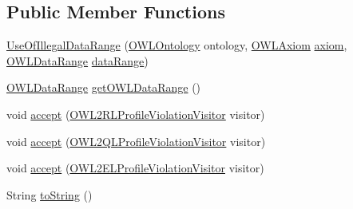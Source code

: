 \subsection*{Public Member Functions}
\begin{DoxyCompactItemize}
\item 
\hyperlink{classorg_1_1semanticweb_1_1owlapi_1_1profiles_1_1_use_of_illegal_data_range_aba1737586b472d79b58e861dc62be328}{Use\-Of\-Illegal\-Data\-Range} (\hyperlink{interfaceorg_1_1semanticweb_1_1owlapi_1_1model_1_1_o_w_l_ontology}{O\-W\-L\-Ontology} ontology, \hyperlink{interfaceorg_1_1semanticweb_1_1owlapi_1_1model_1_1_o_w_l_axiom}{O\-W\-L\-Axiom} \hyperlink{classorg_1_1semanticweb_1_1owlapi_1_1profiles_1_1_o_w_l_profile_violation_aa7c8e8910ed3966f64a2c003fb516214}{axiom}, \hyperlink{interfaceorg_1_1semanticweb_1_1owlapi_1_1model_1_1_o_w_l_data_range}{O\-W\-L\-Data\-Range} \hyperlink{classorg_1_1semanticweb_1_1owlapi_1_1profiles_1_1_use_of_illegal_data_range_a2bfd0fdd931efd86e9620b80ef08c7cb}{data\-Range})
\item 
\hyperlink{interfaceorg_1_1semanticweb_1_1owlapi_1_1model_1_1_o_w_l_data_range}{O\-W\-L\-Data\-Range} \hyperlink{classorg_1_1semanticweb_1_1owlapi_1_1profiles_1_1_use_of_illegal_data_range_ac32fd4afcf26a4140333ba78dbdd71e5}{get\-O\-W\-L\-Data\-Range} ()
\item 
void \hyperlink{classorg_1_1semanticweb_1_1owlapi_1_1profiles_1_1_use_of_illegal_data_range_a09e72c1a9bf32a4d31f2f3dd9e24fce1}{accept} (\hyperlink{interfaceorg_1_1semanticweb_1_1owlapi_1_1profiles_1_1_o_w_l2_r_l_profile_violation_visitor}{O\-W\-L2\-R\-L\-Profile\-Violation\-Visitor} visitor)
\item 
void \hyperlink{classorg_1_1semanticweb_1_1owlapi_1_1profiles_1_1_use_of_illegal_data_range_af4b6454c3f28c3b76d76ea0baacea1c1}{accept} (\hyperlink{interfaceorg_1_1semanticweb_1_1owlapi_1_1profiles_1_1_o_w_l2_q_l_profile_violation_visitor}{O\-W\-L2\-Q\-L\-Profile\-Violation\-Visitor} visitor)
\item 
void \hyperlink{classorg_1_1semanticweb_1_1owlapi_1_1profiles_1_1_use_of_illegal_data_range_afb3fd710675197a52af34d435e200a11}{accept} (\hyperlink{interfaceorg_1_1semanticweb_1_1owlapi_1_1profiles_1_1_o_w_l2_e_l_profile_violation_visitor}{O\-W\-L2\-E\-L\-Profile\-Violation\-Visitor} visitor)
\item 
String \hyperlink{classorg_1_1semanticweb_1_1owlapi_1_1profiles_1_1_use_of_illegal_data_range_a80bfb213b8ce077ddf6f6613ccf4b14d}{to\-String} ()
\end{DoxyCompactItemize}
